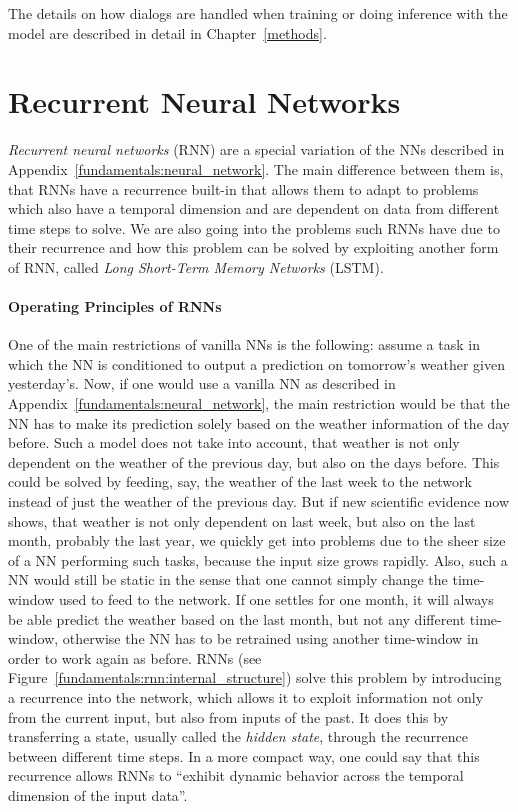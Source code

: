 The details on how dialogs are handled when training or doing inference with the model are described in detail in Chapter~\ref{methods}.

\section{Recurrent Neural Networks}
\emph{Recurrent neural networks} (RNN) are a special variation of the NNs described in Appendix~\ref{fundamentals:neural_network}. The main difference between them is, that RNNs have a recurrence built-in that allows them to adapt to problems which also have a temporal dimension and are dependent on data from different time steps to solve. We are also going into the problems such RNNs have due to their recurrence and how this problem can be solved by exploiting another form of RNN, called \emph{Long Short-Term Memory Networks} (LSTM).

\paragraph{Operating Principles of RNNs}
One of the main restrictions of vanilla NNs is the following: assume a task in which the NN is conditioned to output a prediction on tomorrow's weather given yesterday's. Now, if one would use a vanilla NN as described in Appendix~\ref{fundamentals:neural_network}, the main restriction would be that the NN has to make its prediction solely based on the weather information of the day before. Such a model does not take into account, that weather is not only dependent on the weather of the previous day, but also on the days before. This could be solved by feeding, say, the weather of the last week to the network instead of just the weather of the previous day. But if new scientific evidence now shows, that weather is not only dependent on last week, but also on the last month, probably the last year, we quickly get into problems due to the sheer size of a NN performing such tasks, because the input size grows rapidly. Also, such a NN would still be static in the sense that one cannot simply change the time-window used to feed to the network. If one settles for one month, it will always be able predict the weather based on the last month, but not any different time-window, otherwise the NN has to be retrained using another time-window in order to work again as before. RNNs (see Figure~\ref{fundamentals:rnn:internal_structure}) solve this problem by introducing a recurrence into the network, which allows it to exploit information not only from the current input, but also from inputs of the past. It does this by transferring a state, usually called the \emph{hidden state}, through the recurrence between different time steps. In a more compact way, one could say that this recurrence allows RNNs to ``exhibit dynamic behavior across the temporal dimension of the input data''.

